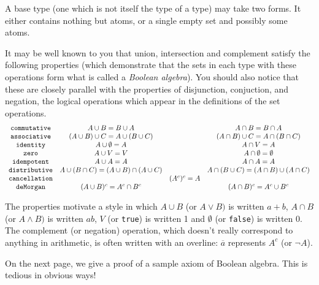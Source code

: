 \documentclass[12pt]{book}
\begin{document}
A base type (one which is not itself the type of a type) may take two forms.  It either contains nothing but atoms, or a single empty set and possibly some atoms.

It may be well known to you that union, intersection and complement satisfy the following properties (which demonstrate that the sets in each type with these operations form what is called a {\em Boolean algebra\/}).  You should also notice that these are closely parallel with the properties of disjunction, conjuction, and negation, the logical operations which appear in the definitions of the set operations.
{\tiny
$$\begin{array}{cccc}

{\tt commutative} & A\cup B = B \cup A& & A \cap B = B \cap A \\

{\tt associative}  & (A \cup B) \cup C = A \cup (B \cup C) & & (A \cap B) \cup C = A \cap (B \cap C) \\

{\tt identity}  &  A \cup \emptyset = A& & A \cap V = A \\

{\tt zero} & A \cup V = V & & A \cap \emptyset = \emptyset \\

{\tt idempotent} & A \cup A = A & & A \cap A = A \\

{\tt distributive} & A \cup (B \cap C) = (A \cup B) \cap (A \cup C)& & A \cap (B \cup C) = (A \cap B) \cup (A \cap C) \\

{\tt cancellation} & & (A^c)^c=A&  \\

{\tt deMorgan} & (A \cup B)^c = A^c \cap B^c & & (A \cap B)^c = A^c \cup B^c \\


\end{array}$$}

The properties motivate a style in which $A \cup B$ (or $A \vee B)$ is written $a + b$,  $A \cap B$ (or $A \wedge B)$ is written $ab$, $V$ (or {\tt true}) is written 1
and $\emptyset$ (or {\tt false}) is written 0.  The complement (or negation) operation, which doesn't really correspond to anything in arithmetic, is often written with an overline:  $\overline{a}$ represents $A^c$ (or $\neg A$).

On the next page, we give a proof of a sample  axiom of Boolean algebra.  This is tedious in obvious ways!
\end{document}
